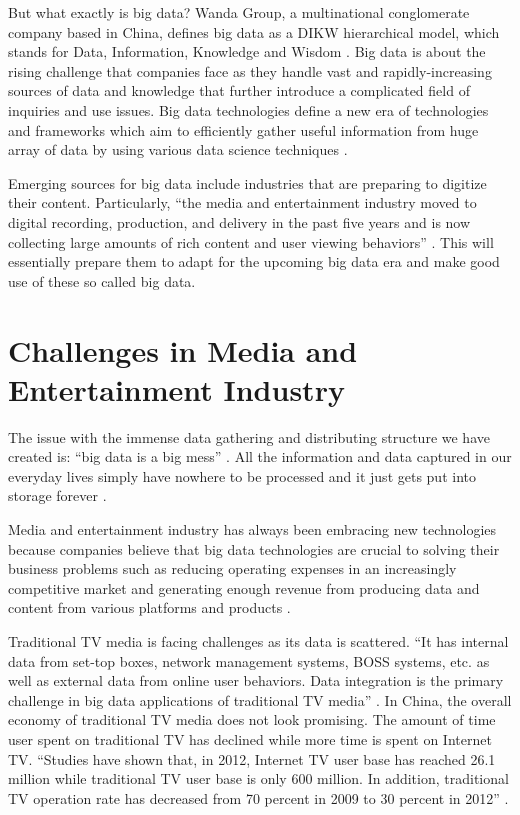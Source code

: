 \documentclass[sigconf]{acmart}
\begin{document}
But what exactly is big data? Wanda Group, a multinational conglomerate company based in China, defines big data as a DIKW hierarchical model, which stands for Data, Information, Knowledge and Wisdom \cite{Zhang2017era}. Big data is about the rising challenge that companies face as they handle vast and rapidly-increasing sources of data and knowledge that further introduce a complicated field of inquiries and use issues. Big data technologies define a new era of technologies and frameworks which aim to efficiently gather useful information from huge array of data by using various data science techniques \cite{Villars2011care}.

Emerging sources for big data include industries that are preparing to digitize their content. Particularly, ``the media and entertainment industry moved to digital recording, production, and delivery in the past five years and is now collecting large amounts of rich content and user viewing behaviors'' \cite{Villars2011care}. This will essentially prepare them to adapt for the upcoming big data era and make good use of these so called big data. 

\section{Challenges in Media and Entertainment Industry}

The issue with the immense data gathering and distributing structure we have created is: ``big data is a big mess'' \cite{Schlieski2012data}. All the information and data captured in our everyday lives simply have nowhere to be processed and it just gets put into storage forever \cite{Schlieski2012data}.

Media and entertainment industry has always been embracing new technologies because companies believe that big data technologies are crucial to solving their business problems such as reducing operating expenses in an increasingly competitive market and generating enough revenue from producing data and content from various platforms and products \cite{Lippell2016sectors}.

Traditional TV media is facing challenges as its data is scattered. ``It has internal data from set-top boxes, network management systems, BOSS systems, etc. as well as external data from online user behaviors. Data integration is the primary challenge in big data applications of traditional TV media'' \cite{Zhang2017era}. In China, the overall economy of traditional TV media does not look promising. The amount of time user spent on traditional TV has declined while more time is spent on Internet TV. ``Studies have shown that, in 2012, Internet TV user base has reached 26.1 million while traditional TV user base is only 600 million. In addition, traditional TV operation rate has decreased from 70 percent in 2009 to 30 percent in 2012'' \cite{Zhang2017era}.
\end{document}

